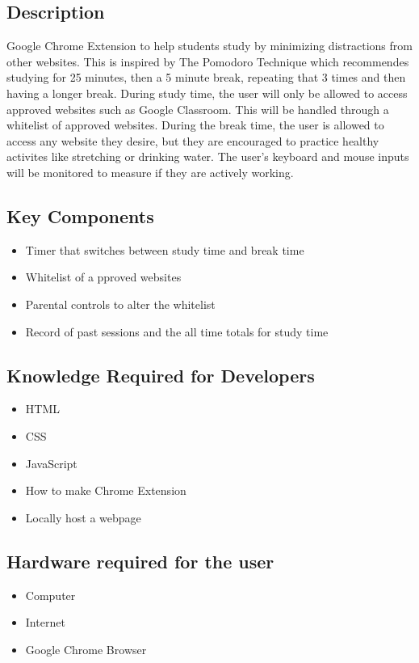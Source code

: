 \documentclass[12pt]{article}
\begin{document}
\subsection{Description}
Google Chrome Extension to help students study by minimizing distractions from other websites.
This is inspired by The Pomodoro Technique which recommendes studying for 25 minutes, then a 5 minute break, repeating that 3 times and then having a longer break.
During study time, the user will only be allowed to access approved websites such as Google Classroom. This will be handled through a whitelist of approved websites.
During the break time, the user is allowed to access any website they desire, but they are encouraged to practice healthy activites like stretching or drinking water.
The user's keyboard and mouse inputs will be monitored to measure if they are actively working.
\subsection{Key Components}
\begin{itemize}
    \item Timer that switches between study time and break time
    \item Whitelist of a pproved websites
    \item Parental controls to alter the whitelist
    \item Record of past sessions and the all time totals for study time
\end{itemize}
\subsection{Knowledge Required for Developers} 
\begin{itemize}
    \item HTML
    \item CSS 
    \item JavaScript 
    \item How to make Chrome Extension
    \item Locally host a webpage
\end{itemize}
\subsection{Hardware required for the user}
\begin{itemize}
    \item Computer
    \item Internet
    \item Google Chrome Browser
\end{itemize}
\end{document}

